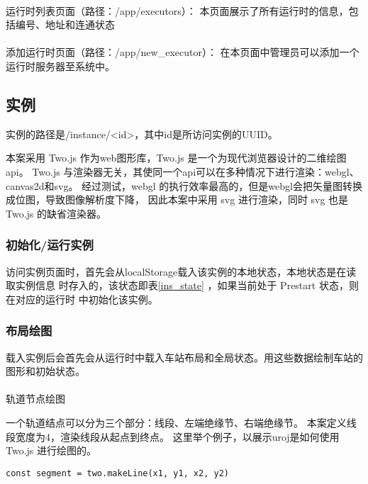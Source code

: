 \paragraph{} 运行时列表页面（路径：/app/executors）：
本页面展示了所有运行时的信息，包括编号、地址和连通状态

\paragraph{} 添加运行时页面（路径：/app/new\_executor）：
在本页面中管理员可以添加一个运行时服务器至系统中。

\subsection{实例}
实例的路径是/instance/<id>，其中id是所访问实例的UUID。

本案采用 Two.js 作为web图形库，Two.js 是一个为现代浏览器设计的二维绘图api。
Two.js 与渲染器无关，其使同一个api可以在多种情况下进行渲染：webgl、canvas2d和svg。
经过测试，webgl 的执行效率最高的，但是webgl会把矢量图转换成位图，导致图像解析度下降，
因此本案中采用 svg 进行渲染，同时 svg 也是 Two.js 的缺省渲染器。

\subsubsection{初始化/运行实例}
访问实例页面时，首先会从localStorage载入该实例的本地状态，本地状态是在读取实例信息
时存入的，该状态即表\ref{ins_state} ，如果当前处于 Prestart 状态，则在对应的运行时
中初始化该实例。

\subsubsection{布局绘图}

载入实例后会首先会从运行时中载入车站布局和全局状态。用这些数据绘制车站的图形和初始状态。

\paragraph{}轨道节点绘图

一个轨道结点可以分为三个部分：线段、左端绝缘节、右端绝缘节。
本案定义线段宽度为4，渲染线段从起点到终点。
这里举个例子，以展示uroj是如何使用Two.js 进行绘图的。
\begin{lstlisting}
const segment = two.makeLine(x1, y1, x2, y2)
\end{lstlisting}

